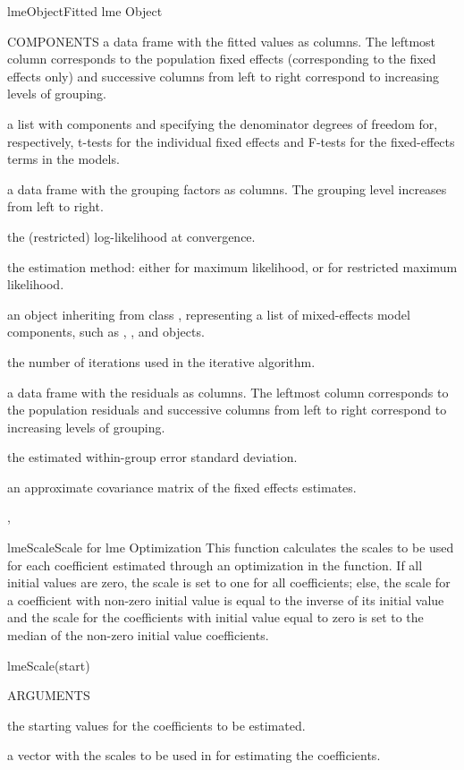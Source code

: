 \documentclass[pdftex]{article} \usepackage{url,graphicx}
\begin{document}
\begin{Helpfile}{lmeObject}{Fitted lme Object}
\begin{Argument}{COMPONENTS}
a data frame with the fitted values as columns. The
leftmost column corresponds to the population fixed effects
(corresponding to the fixed effects only) and successive columns
from left to right correspond to increasing levels of grouping.
\item[\Co{fixDF:}]
a list with components  and 
specifying the denominator degrees of freedom for, respectively,
t-tests for the individual fixed effects and F-tests for the
fixed-effects terms in the models.
\item[\Co{groups:}]
a data frame with the grouping factors as
columns. The grouping level increases from left to right.
\item[\Co{logLik:}]
the (restricted) log-likelihood at convergence.
\item[\Co{method:}]
the estimation method: either  for maximum
likelihood, or  for restricted maximum likelihood.
\item[\Co{modelStruct:}]
an object inheriting from class ,
representing a list of mixed-effects model components, such
as , , and  objects.
\item[\Co{numIter:}]
the number of iterations used in the iterative
algorithm.
\item[\Co{residuals:}]
a data frame with the residuals as columns. The
leftmost column corresponds to the population residuals
and successive columns from left to right correspond to increasing
levels of grouping.
\item[\Co{sigma:}]
the estimated within-group error standard deviation.
\item[\Co{varFix:}]
an approximate covariance matrix of the
fixed effects estimates.
\end{Argument}
, 
\end{Helpfile}
\begin{Helpfile}{lmeScale}{Scale for lme Optimization}
This function calculates the scales to be used for each coefficient
estimated through an  optimization in the 
function. If all initial values are zero, the scale is set to one for
all coefficients; else, the scale for a coefficient with non-zero
initial value is equal to the inverse of its initial value and the
scale for the coefficients with initial value equal to zero is set to
the median of the non-zero initial value coefficients.
\begin{Example}
lmeScale(start)
\end{Example}
\begin{Argument}{ARGUMENTS}
\item[\Co{start:}]
the starting values for the coefficients to be estimated.
\end{Argument}
a vector with the scales to be used in  for estimating the
coefficients.
\end{Helpfile}
\end{document}
